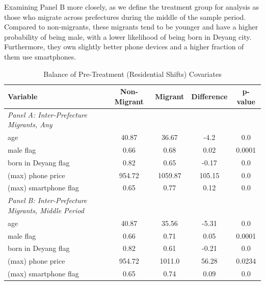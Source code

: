 
Examining Panel B more closely, as we define the treatment group for analysis as those who migrate across prefectures during the middle of the sample period.
Compared to non-migrants, these migrants tend to be younger and have a higher probability of being male, with a lower likelihood of being born in Deyang city.
Furthermore, they own slightly better phone devices and a higher fraction of them use smartphones.

\begin{table}[htbp]
\vspace{0.2cm}
\renewcommand{\arraystretch}{1.6}
\setlength{\tabcolsep}{1mm}{}
\centering
\small
\caption{Balance of Pre-Treatment (Residential Shifts) Covariates}

\begin{tabular}{lcccc} \hline
Variable & Non-Migrant & Migrant & Difference & p-value \\ \hline
\textit{Panel A: Inter-Prefecture Migrants, Any} \\
age & 40.87 & 36.67 & -4.2 & 0.0 \\
male flag & 0.66 & 0.68 & 0.02 & 0.0001 \\
born in Deyang flag & 0.82 & 0.65 & -0.17 & 0.0 \\
(max) phone price & 954.72 & 1059.87 & 105.15 & 0.0 \\
(max) smartphone flag & 0.65 & 0.77 & 0.12 & 0.0 \\ \hline

\textit{Panel B: Inter-Prefecture Migrants, Middle Period} \\
age & 40.87 & 35.56 & -5.31 & 0.0 \\
male flag & 0.66 & 0.71 & 0.05 & 0.0001 \\
born in Deyang flag & 0.82 & 0.61 & -0.21 & 0.0 \\
(max) phone price & 954.72 & 1011.0 & 56.28 & 0.0234 \\
(max) smartphone flag & 0.65 & 0.74 & 0.09 & 0.0 \\ \hline

\end{tabular}

\label{tab:non_migrant_migrant_comparison}%
\end{table}%

